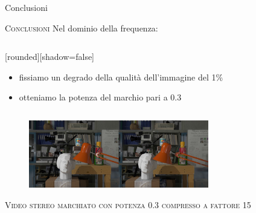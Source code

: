 \documentclass{beamer}
\begin{document}
\begin{section}{Conclusioni}
\begin{frame}[t]{\textsc{Conclusioni}}
Nel dominio della frequenza:
\begin{columns}
\begin{column}{5cm}
[rounded][shadow=false]
\begin{block}{}
\begin{itemize}
\item fissiamo un degrado della qualit\`{a} dell'immagine del 1\%
\item otteniamo la potenza del marchio pari a 0.3 
\end{itemize}
\end{block}

\end{column}
\begin{column}{5cm}
\vspace{-10mm}
\begin{table}
\end{table}

\end{column}
\end{columns}
\vspace{2mm}
\begin{figure}
  \includegraphics[width=0.7\textwidth]{./img_wat/marked_03_DFT.jpg}  
  \caption{} 
  \label{fig:mg1}
\end{figure}
\end{frame}



\begin{frame}[t]{\textsc{Video stereo marchiato con potenza 0.3 compresso a fattore 15
}}
\vspace{2mm}
\begin{center}
\end{center}

\end{frame}
\end{section}
\end{document}
